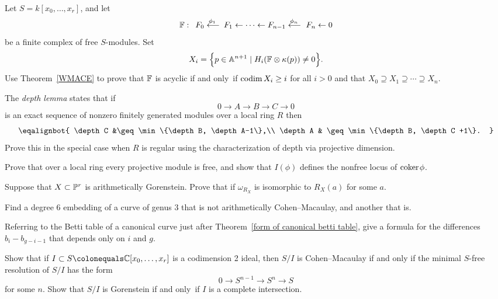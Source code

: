 \begin{exercise}\label{WMACE corollary}
Let $S = k[x_0,\dots, x_r]$, and let
$$
\FF:\quad  
F_0\luto{\phi_1}F_1 \leftarrow \cdots \leftarrow F_{n-1}\luto{\phi_n} F_n\leftarrow 0
$$
be a finite complex of free $S$-modules. Set
$$
X_i =\Big\{p\in \mathbb A^{n+1} \mid  H_i({\mathbb F} \otimes \kappa(p)) \neq 0 \Big\}.
$$
Use Theorem~\ref{WMACE} to prove that ${\mathbb F}$ is 
acyclic
%
if and only~if
$
\operatorname{codim} X_i \geq i
$
for all $i>0$ and that $X_{0}\supseteq X_{1}\supseteq \cdots \supseteq
X_{n}$.
\end{exercise}

\begin{exercise}
The \emph{depth lemma} states that if
%
$$
0\to A\to B\to C \to 0
$$
is an exact sequence of nonzero finitely generated modules over a local
ring $R$ then
$$
\let\\\cr
\eqalignbot{
\depth C &\geq \min\{\depth B, \depth A-1\},\\
\depth A & \geq \min\{\depth B, \depth C +1\}.
}
$$
Prove this in the special case when $R$ is regular using the
characterization of depth
via projective dimension.
\end{exercise}

\begin{exercise}
 Prove that over a local ring every projective module is free,
and show that
$I(\phi)$ defines the nonfree locus of ${\rm{coker}\kern1pt} \phi$.
\end{exercise}

\begin{exercise} Suppose that $X\subset {\mathbb P}^{r}$ is arithmetically Gorenstein.
Prove that 
%
if $\omega_{R_{X}}$  is isomorphic to $R_{X}(a)$ for some
$a$. 
\end{exercise}

\begin{exercise}
Find a degree 6 embedding of a curve of genus 3 that is not arithmetically
Cohen--Macaulay, and another that is.
\end{exercise}

\begin{exercise}
Referring to the Betti table of a canonical curve just after Theorem~\ref{form of canonical betti table},
%
give a formula
for the differences $b_i- b_{g-i-1}$ that depends only on $i$ and $g$.
\end{exercise}

\begin{exercise}
Show that if $I \subset S \colonequals  \CC[x_0,\dots, x_r]$ is a
codimension 2 ideal, then $S/I$ is Cohen--Macaulay if and only
if the minimal $S$-free resolution of $S/I$ has the form
$$
0\to S^{n-1} \to S^n \to S
$$
for some $n$. Show that $S/I$ is Gorenstein if and only~if $I$ is a
complete intersection.
\end{exercise}


